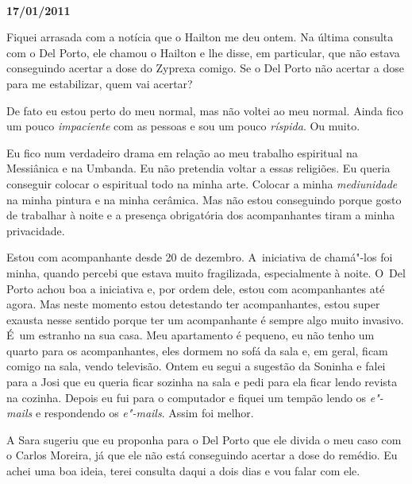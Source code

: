 \begin{center}\asterisc{}​\end{center}

\begin{flushright}\textbf{}\end{flushright}

\begin{flushright}\textbf{17/01/2011}\end{flushright}


Fiquei arrasada com a notícia que o Hailton me deu ontem. Na última
consulta com o Del Porto, ele chamou o Hailton e lhe disse, em
particular, que não estava conseguindo acertar a dose do Zyprexa comigo.
Se o Del Porto não acertar a dose para me estabilizar, quem vai acertar?

De fato eu estou perto do meu normal, mas não voltei ao meu normal.
Ainda fico um pouco \emph{impaciente} com as pessoas e sou um pouco
\emph{ríspida}. Ou muito.

Eu fico num verdadeiro drama em relação ao meu trabalho espiritual na
Messiânica e na Umbanda. Eu não pretendia voltar a essas religiões. Eu
queria conseguir colocar o espiritual todo na minha arte. Colocar a
minha \emph{mediunidade} na minha pintura e na minha cerâmica. Mas não
estou conseguindo porque gosto de trabalhar à noite e a presença
obrigatória dos acompanhantes tiram a minha privacidade.

Estou com acompanhante desde 20 de dezembro. A~iniciativa de chamá"-los
foi minha, quando percebi que estava muito fragilizada, especialmente à
noite. O~Del Porto achou boa a iniciativa e, por ordem dele, estou com
acompanhantes até agora. Mas neste momento estou detestando ter
acompanhantes, estou super exausta nesse sentido porque ter um
acompanhante é sempre algo muito invasivo. É~um estranho na sua casa.
Meu apartamento é pequeno, eu não tenho um quarto para os acompanhantes,
eles dormem no sofá da sala e, em geral, ficam comigo na sala, vendo
televisão. Ontem eu segui a sugestão da Soninha e falei para a Josi que
eu queria ficar sozinha na sala e pedi para ela ficar lendo revista na
cozinha. Depois eu fui para o computador e fiquei um tempão lendo os
\emph{e"-mails} e respondendo os \emph{e"-mails}. Assim foi melhor.

A Sara sugeriu que eu proponha para o Del Porto que ele divida o meu
caso com o Carlos Moreira, já que ele não está conseguindo acertar a
dose do remédio. Eu achei uma boa ideia, terei consulta daqui a dois
dias e vou falar com ele.

